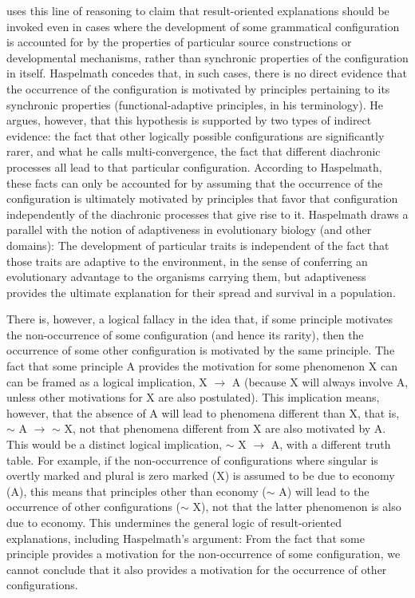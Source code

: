 \documentclass[output=paper]{langsci/langscibook}
\begin{document}
\citet{Haspelmath 2019 (this volume)} uses this line of reasoning to claim that
result-oriented explanations  should be invoked even in cases where
the development of some grammatical configuration is accounted
for by the properties of particular source constructions or developmental
mechanisms, rather than synchronic properties of the configuration in itself.  Haspelmath concedes that, in such cases,
there is no direct evidence that the occurrence of the
configuration is motivated by principles pertaining to its synchronic
properties (functional-adaptive principles, in his terminology). He argues, however, that this
hypothesis is supported by two types of indirect evidence: the fact
that other logically possible configurations are significantly rarer, and what he calls
multi-convergence, the fact that different  diachronic processes all
lead to that particular configuration. According to Haspelmath, these facts
can only be accounted for by assuming that the occurrence of
the configuration is ultimately motivated by
principles that favor that configuration independently of the
diachronic processes that give rise to it.
 Haspelmath draws a parallel with the notion
of adaptiveness in evolutionary biology (and other domains):
The development of particular traits is independent of the fact that
those traits are adaptive to the environment, in the sense of conferring an evolutionary advantage to the organisms
carrying them, but adaptiveness provides the ultimate explanation for their
spread and survival in a population.

There is, however, a logical fallacy in the idea that, if some
 principle motivates the  non-occurrence of some
configuration (and hence its rarity),
then the occurrence of some other configuration is motivated by the
same principle. The fact that some principle A provides the motivation
for some phenomenon X can can be framed as a logical implication,  X
$\rightarrow$ A (because X will always involve A, unless other
motivations for X are also postulated).  This
implication means, however, that the absence of A will lead to phenomena different
than X, that is, $\sim$ A $\rightarrow$ $\sim$ X, not that phenomena
different from X are also motivated by A. This would be a distinct logical
implication, $\sim$ X $\rightarrow$ A, with a different truth table.
For example, if the non-occurrence
of configurations where singular is
overtly marked and plural is zero marked (X)  is assumed to be due to
economy (A), this means that principles other than economy ($\sim$ A) will lead to the occurrence of other configurations ($\sim$ X), not that
the latter phenomenon is also due to economy. This undermines the general
logic of result-oriented explanations, including Haspelmath's
argument: From the fact that some principle provides 
a motivation for the non-occurrence of some
configuration, we cannot conclude that it also provides a
motivation for the occurrence of other configurations.
\end{document}
